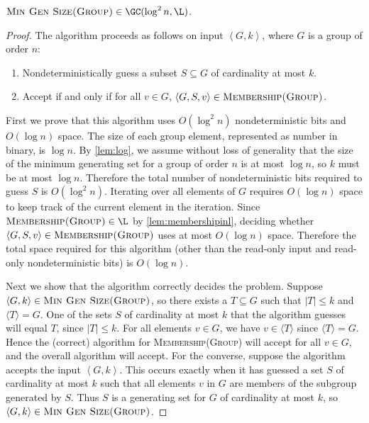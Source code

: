 \documentclass{article}
\newcommand{\gen}[1]{{\langle #1 \rangle}}
\newcommand{\pair}[2]{\left\langle #1, #2 \right\rangle}
\newcommand{\triple}[3]{\left\langle #1, #2, #3 \right\rangle}
\begin{document}
\begin{theorem}\label{thm:mingengc}
  $\textsc{Min Gen Size(Group)} \in \GC(\log^2 n, \L)$.
\end{theorem}
\begin{proof}
  The algorithm proceeds as follows on input $\pair{G}{k}$, where $G$ is a group of order $n$:
  \begin{enumerate}
  \item Nondeterministically guess a subset $S \subseteq G$ of cardinality at most $k$.
  \item Accept if and only if for all $v \in G$, $\triple{G}{S}{v} \in \textsc{Membership(Group)}$.
  \end{enumerate}

  First we prove that this algorithm uses $O(\log^2 n)$ nondeterministic bits and $O(\log n)$ space.
  The size of each group element, represented as number in binary, is $\log n$.
  By \autoref{lem:log}, we assume without loss of generality that the size of the minimum generating set for a group of order $n$ is at most $\log n$, so $k$ must be at most $\log n$.
  Therefore the total number of nondeterministic bits required to guess $S$ is $O(\log^2 n)$.
  Iterating over all elements of $G$ requires $O(\log n)$ space to keep track of the current element in the iteration.
  Since $\textsc{Membership(Group)} \in \L$ by \autoref{lem:membershipinl}, deciding whether $\triple{G}{S}{v} \in \textsc{Membership(Group)}$ uses at most $O(\log n)$ space.
  Therefore the total space required for this algorithm (other than the read-only input and read-only nondeterministic bits) is $O(\log n)$.

  Next we show that the algorithm correctly decides the problem.
  Suppose $\pair{G}{k} \in \textsc{Min Gen Size(Group)}$, so there exists a $T \subseteq G$ such that $|T| \leq k$ and $\gen{T} = G$.
  One of the sets $S$ of cardinality at most $k$ that the algorithm guesses will equal $T$, since $|T| \leq k$.
  For all elements $v \in G$, we have $v \in \gen{T}$ since $\gen{T} = G$.
  Hence the (correct) algorithm for \textsc{Membership(Group)} will accept for all $v \in G$, and the overall algorithm will accept.
  For the converse, suppose the algorithm accepts the input $\pair{G}{k}$.
  This occurs exactly when it has guessed a set $S$ of cardinality at most $k$ such that all elements $v$ in $G$ are members of the subgroup generated by $S$.
  Thus $S$ is a generating set for $G$ of cardinality at most $k$, so $\pair{G}{k} \in \textsc{Min Gen Size(Group)}$.
\end{proof}
\end{document}
